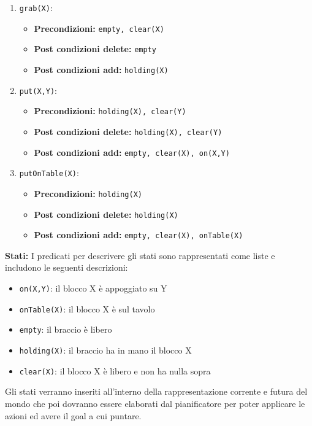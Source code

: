 \documentclass[12pt,twoside]{report}
\begin{document}
\begin{enumerate}
    \item \texttt{grab(X)}:
    \begin{itemize}
        \item \textbf{Precondizioni:} \texttt{empty, clear(X)}
        \item \textbf{Post condizioni delete:} \texttt{empty}
        \item \textbf{Post condizioni add:} \texttt{holding(X)}
    \end{itemize}

    \item \texttt{put(X,Y)}:
    \begin{itemize}
        \item \textbf{Precondizioni:} \texttt{holding(X), clear(Y)}
        \item \textbf{Post condizioni delete:} \texttt{holding(X), clear(Y)}
        \item \textbf{Post condizioni add:} \texttt{empty, clear(X), on(X,Y)}
    \end{itemize}

    \item \texttt{putOnTable(X)}:
    \begin{itemize}
        \item \textbf{Precondizioni:} \texttt{holding(X)}
        \item \textbf{Post condizioni delete:} \texttt{holding(X)}
        \item \textbf{Post condizioni add:} \texttt{empty, clear(X), onTable(X)}
    \end{itemize}
\end{enumerate}

\textbf{Stati:}
I predicati per descrivere gli stati sono rappresentati come liste e includono le seguenti descrizioni:
\begin{itemize}
    \item \texttt{on(X,Y)}: il blocco X è appoggiato su Y
    \item \texttt{onTable(X)}: il blocco X è sul tavolo
    \item \texttt{empty}: il braccio è libero
    \item \texttt{holding(X)}: il braccio ha in mano il blocco X
    \item \texttt{clear(X)}: il blocco X è libero e non ha nulla sopra
\end{itemize}

Gli stati verranno inseriti all'interno della rappresentazione corrente e futura del mondo che poi dovranno essere elaborati dal pianificatore per poter applicare le azioni ed avere il goal a cui puntare.
\end{document}

